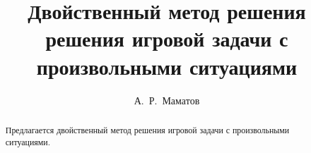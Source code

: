 
\usepackage{todonotes} %

\usepackage[russian]{nla}

%
%


%



\fi
%

\title{Двойственный метод решения решения игровой задачи с произвольными ситуациями}
\author{А.~Р.~Маматов%
} %


\maketitle

\begin{abstract}
Предлагается двойственный метод решения игровой задачи с произвольными ситуациями.

\end{abstract}

